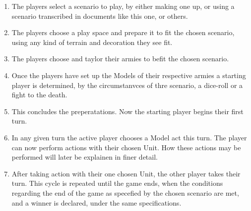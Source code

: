 \documentclass[a4paper,14pt]{book}
\begin{document}
\begin{adjustwidth}{-3cm}{-3cm}
\begin{multicols}{2}
\begin{enumerate}

	\item The players select a scenario to play, by either making one up, or using a scenario transcribed in documents like this one, or others.
	\item The players choose a play space and prepare it to fit the chosen scenario, using any kind of terrain and decoration they see fit.
	\item The players choose and taylor their armies to befit the chosen scenario.
 	\item Once the players have set up the Models of their respective armies a starting player is determined, by the circumstanvces of thre scenario, a dice-roll or a fight to the death.
	\item This concludes the preperatations. Now the starting player begins their first turn.
	\item In any given turn the active player chooses a Model act this turn. The player can now perform actions with their chosen Unit. How these actions may be performed will later be explainen in finer detail.
	\item After taking action with their one chosen Unit, the other player takes their turn. This cycle is repeated until the game ends, when the conditions regarding the end of the game as specefied by the chosen scenario are met, and a winner is declared, under the same specifications.
	
\end{enumerate}
\end{multicols}
\end{adjustwidth}
\end{document}
